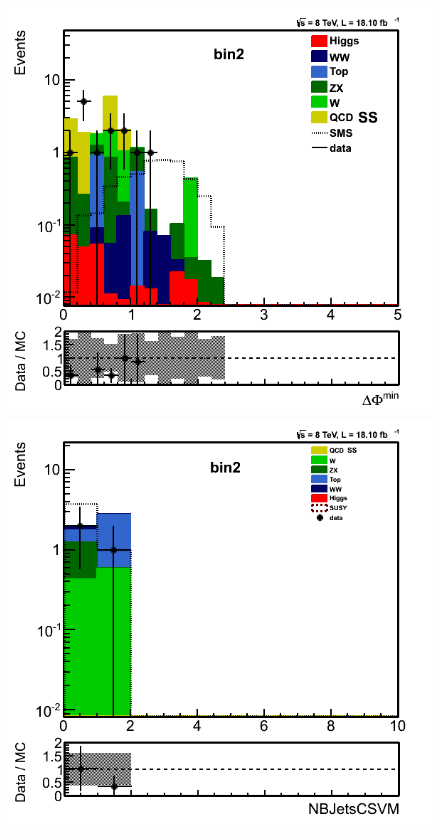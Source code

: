 \begin{figure}[!Hhtb]
\includegraphics[angle=0,scale=0.35]{TauTauFigs/mindphi_bin2_14nov.png}
\includegraphics[angle=0,scale=0.35]{TauTauFigs/NB_bin2_14nov.png}

\end{figure}
